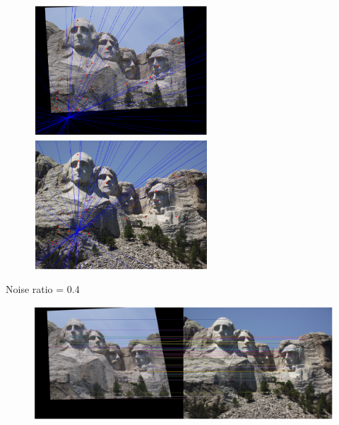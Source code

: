 \documentclass[11pt]{article}
\begin{document}
\begin{figure}[H]
    \centering
    \includegraphics[width=6.5cm]{images/part3/ransac_image_1_noise_0.3_left.png}
    \includegraphics[width=6.5cm]{images/part3/ransac_image_1_noise_0.3_right.png}
\end{figure}

Noise ratio = 0.4
\begin{figure}[H]
    \centering
    \includegraphics[width=14cm]{images/part3/ransac_image_1_noise_0.4_1.png}
\end{figure}
\end{document}
